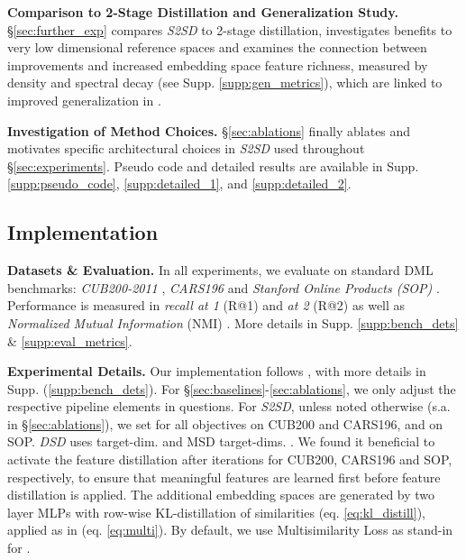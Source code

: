 \documentclass{article} \usepackage{arxiv_style,times}
\begin{document}
\textbf{Comparison to 2-Stage Distillation and Generalization Study.} \S\ref{sec:further_exp} compares \textit{S2SD} to 2-stage distillation, investigates benefits to very low dimensional reference spaces and examines the connection between improvements and increased embedding space feature richness, measured by density and spectral decay (see Supp. \ref{supp:gen_metrics}), which are linked to improved generalization in \cite{roth2020revisiting}.

\textbf{Investigation of Method Choices.} \S\ref{sec:ablations} finally ablates and motivates specific architectural choices in \textit{S2SD} used throughout \S \ref{sec:experiments}. Pseudo code and detailed results are available in Supp. \ref{supp:pseudo_code}, \ref{supp:detailed_1}, and \ref{supp:detailed_2}.

\subsection{Implementation}
\textbf{Datasets \& Evaluation.}
In all experiments, we evaluate on standard DML benchmarks: \textit{CUB200-2011} \citep{cub200-2011}, \textit{CARS196} \citep{cars196} and \textit{Stanford Online Products (SOP)} \citep{lifted}.
Performance is measured in \textit{recall at 1} (R@1) and \textit{at 2} (R@2) \citep{recall} as well as \textit{Normalized Mutual Information} (NMI) \citep{nmi}. More details in Supp. \ref{supp:bench_dets} \& \ref{supp:eval_metrics}.

\textbf{Experimental Details.}
Our implementation follows \citet{roth2020revisiting}, with more details in Supp. (\ref{supp:bench_dets}). For \S\ref{sec:baselines}-\ref{sec:ablations}, we only adjust the respective pipeline elements in questions.
For \textit{S2SD}, unless noted otherwise (s.a. in \S \ref{sec:ablations}), we set  for all objectives on CUB200 and CARS196, and  on SOP. \textit{DSD} uses target-dim.  and MSD target-dims. .
We found it beneficial to activate the feature distillation after  iterations for CUB200, CARS196 and SOP, respectively, to ensure that meaningful features are learned first before feature distillation is applied. The additional embedding spaces are generated by two layer MLPs with row-wise KL-distillation of similarities (eq. \ref{eq:kl_distill}), applied as in  (eq. \ref{eq:multi}). By default, we use Multisimilarity Loss as stand-in for .
\end{document}
